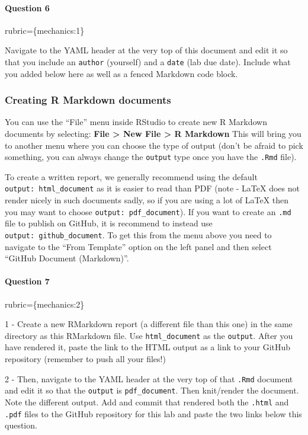 \documentclass[
]{article}
\begin{document}
\begin{alert alert-info}
\hypertarget{question-6}{%
\paragraph{Question 6}\label{question-6}}

rubric=\{mechanics:1\}

Navigate to the YAML header at the very top of this document and edit it
so that you include an \texttt{author} (yourself) and a \texttt{date}
(lab due date). Include what you added below here as well as a fenced
Markdown code block.
\end{alert alert-info}

\hypertarget{creating-r-markdown-documents}{%
\subsubsection{Creating R Markdown
documents}\label{creating-r-markdown-documents}}

You can use the ``File'' menu inside RStudio to create new R Markdown
documents by selecting: \textbf{File \textgreater{} New File
\textgreater{} R Markdown} This will bring you to another menu where you
can choose the type of output (don't be afraid to pick something, you
can always change the \texttt{output} type once you have the
\texttt{.Rmd} file).

To create a written report, we generally recommend using the default
\texttt{output:\ html\_document} as it is easier to read than PDF (note
- LaTeX does not render nicely in such documents sadly, so if you are
using a lot of LaTeX then you may want to choose
\texttt{output:\ pdf\_document}). If you want to create an \texttt{.md}
file to publish on GitHub, it is recommend to instead use
\texttt{output:\ github\_document}. To get this from the menu above you
need to navigate to the ``From Template'' option on the left panel and
then select ``GitHub Document (Markdown)''.

\begin{alert alert-info}
\hypertarget{question-7}{%
\paragraph{Question 7}\label{question-7}}

rubric=\{mechanics:2\}

1 - Create a new RMarkdown report (a different file than this one) in
the same directory as this RMarkdown file. Use \texttt{html\_document}
as the \texttt{output}. After you have rendered it, paste the link to
the HTML output as a link to your GitHub repository (remember to push
all your files!)

2 - Then, navigate to the YAML header at the very top of that
\texttt{.Rmd} document and edit it so that the \texttt{output} is
\texttt{pdf\_document}. Then knit/render the document. Note the
different output. Add and commit that rendered both the \texttt{.html}
and \texttt{.pdf} files to the GitHub repository for this lab and paste
the two links below this question.
\end{alert alert-info}
\end{document}
